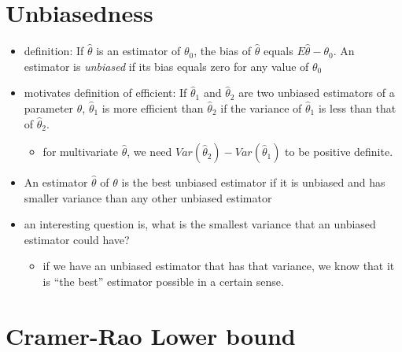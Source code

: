 \documentclass[11pt]{article}
\begin{document}
\section{Unbiasedness}
\label{sec-2}

\begin{itemize}
\item definition: If $\hat \theta$ is an estimator of $\theta_0$,
       the bias of $\hat \theta$ equals $E \hat \theta - \theta_0$.
       An estimator is \emph{unbiased} if its bias equals zero for any
       value of $\theta_0$
\item motivates definition of efficient: If $\hat \theta_1$ and $\hat
       \theta_2$ are two unbiased estimators of a parameter $\theta$,
       $\hat \theta_1$ is more efficient than $\hat \theta_2$ if the
       variance of $\hat \theta_1$ is less than that of $\hat \theta_2$.
\begin{itemize}
\item for multivariate $\hat\theta$, we need $Var(\hat\theta_2) -
         Var(\hat\theta_1)$ to be positive definite.
\end{itemize}
\item An estimator $\hat\theta$ of $\theta$ is the best unbiased
       estimator if it is unbiased and has smaller variance than any
       other unbiased estimator
\item an interesting question is, what is the smallest variance that
       an unbiased estimator could have?
\begin{itemize}
\item if we have an unbiased estimator that has that variance, we
         know that it is ``the best'' estimator possible in a certain sense.
\end{itemize}
\end{itemize}
\section{Cramer-Rao Lower bound}
\label{sec-3}
\end{document}
